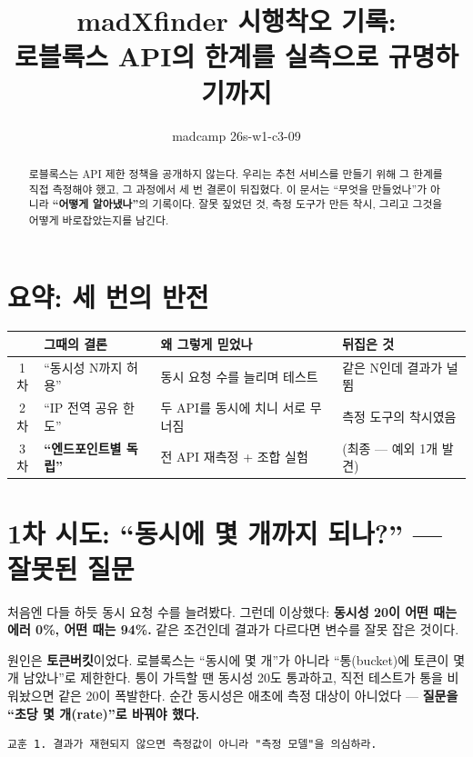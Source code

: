 \documentclass[11pt]{article}
\title{madXfinder 시행착오 기록:\\로블록스 API의 한계를 실측으로 규명하기까지}
\author{madcamp 26s-w1-c3-09}
\date{}
\begin{document}
\maketitle

\begin{abstract}
로블록스는 API 제한 정책을 공개하지 않는다. 우리는 추천 서비스를 만들기 위해
그 한계를 직접 측정해야 했고, 그 과정에서 세 번 결론이 뒤집혔다.
이 문서는 ``무엇을 만들었나''가 아니라 \textbf{``어떻게 알아냈나''}의 기록이다.
잘못 짚었던 것, 측정 도구가 만든 착시, 그리고 그것을 어떻게 바로잡았는지를 남긴다.
\end{abstract}

\section{요약: 세 번의 반전}

\begin{center}
\begin{tabular}{clll}
\toprule
 & 그때의 결론 & 왜 그렇게 믿었나 & 뒤집은 것 \\
\midrule
1차 & ``동시성 N까지 허용'' & 동시 요청 수를 늘리며 테스트 & 같은 N인데 결과가 널뜀 \\
2차 & ``IP 전역 공유 한도'' & 두 API를 동시에 치니 서로 무너짐 & 측정 도구의 착시였음 \\
3차 & \textbf{``엔드포인트별 독립''} & 전 API 재측정 + 조합 실험 & (최종 --- 예외 1개 발견) \\
\bottomrule
\end{tabular}
\end{center}

\section{1차 시도: ``동시에 몇 개까지 되나?'' --- 잘못된 질문}

처음엔 다들 하듯 동시 요청 수를 늘려봤다. 그런데 이상했다:
\textbf{동시성 20이 어떤 때는 에러 0\%, 어떤 때는 94\%.} 같은 조건인데 결과가 다르다면
변수를 잘못 잡은 것이다.

원인은 \textbf{토큰버킷}이었다. 로블록스는 ``동시에 몇 개''가 아니라
``통(bucket)에 토큰이 몇 개 남았나''로 제한한다. 통이 가득할 땐 동시성 20도 통과하고,
직전 테스트가 통을 비워놨으면 같은 20이 폭발한다. 순간 동시성은 애초에 측정 대상이
아니었다 --- \textbf{질문을 ``초당 몇 개(rate)''로 바꿔야 했다.}

\begin{Verbatim}[frame=single, fontsize=\small]
교훈 1. 결과가 재현되지 않으면 측정값이 아니라 "측정 모델"을 의심하라.
\end{Verbatim}
\end{document}
